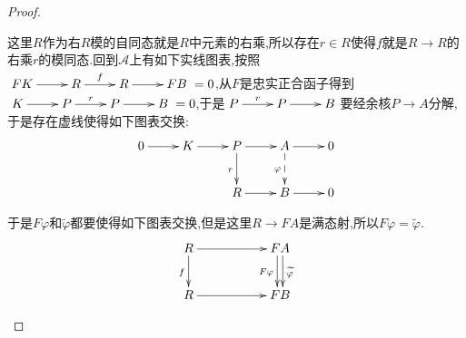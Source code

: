 \begin{proof}
\begin{itemize}
		这里$R$作为右$R$模的自同态就是$R$中元素的右乘,所以存在$r\in R$使得$f$就是$R\to R$的右乘$r$的模同态.回到$\mathscr{A}$上有如下实线图表,按照$\xymatrix{FK\ar[r]&R\ar[r]^f&R\ar[r]&FB}=0$,从$F$是忠实正合函子得到$\xymatrix{K\ar[r]&P\ar[r]^r&P\ar[r]&B}=0$,于是$\xymatrix{P\ar[r]^r&P\ar[r]&B}$要经余核$P\to A$分解,于是存在虚线使得如下图表交换:
		$$\xymatrix{0\ar[r]&K\ar[r]&P\ar[r]\ar[d]_r&A\ar[r]\ar@{-->}[d]_{\varphi}&0\\&&R\ar[r]&B\ar[r]&0}$$
		
		于是$F\varphi$和$\widetilde{\varphi}$都要使得如下图表交换,但是这里$R\to FA$是满态射,所以$F\varphi=\widetilde{\varphi}$.
		$$\xymatrix{R\ar[rr]\ar[d]_f&&FA\ar@<0.5ex>[d]^{\widetilde{\varphi}}\ar@<-0.5ex>[d]_{F\varphi}\\R\ar[rr]&&FB}$$
	\end{itemize}
\end{proof}

